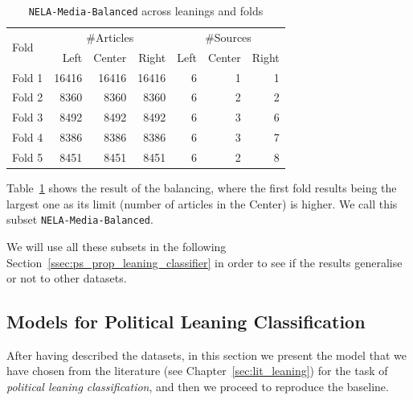 \begin{table}[!htbp]
    \centering
    \begin{tabular}{l|rrr|rrr}
        \multirow{2}{*}{Fold} & \multicolumn{3}{c}{\#Articles} & \multicolumn{3}{c}{\#Sources} \\
         & Left & Center & Right & Left & Center & Right \\
        \hline
        Fold 1 & 16416 & 16416 & 16416 & 6 & 1 & 1 \\
        Fold 2 & 8360 & 8360 & 8360 & 6 & 2 & 2 \\
        Fold 3 & 8492 & 8492 & 8492 & 6 & 3 & 6 \\
        Fold 4 & 8386 & 8386 & 8386 & 6 & 3 & 7 \\
        Fold 5 & 8451 & 8451 & 8451 & 6 & 2 & 8 \\
    \end{tabular}
    \caption{\texttt{NELA-Media-Balanced} across leanings and folds}
    \label{tab:nela_media_balanced}
\end{table}

Table~\ref{tab:nela_media_balanced} shows the result of the balancing, where the first fold results being the largest one as its limit (number of articles in the Center) is higher.
We call this subset \texttt{NELA-Media-Balanced}.

We will use all these subsets in the following Section~\ref{ssec:ps_prop_leaning_classifier} in order to see if the results generalise or not to other datasets.


\subsection{\statusgreen Models for Political Leaning Classification}
\label{ssec:ps_leaning_models}




After having described the datasets, in this section we present the model that we have chosen from the literature (see Chapter~\ref{sec:lit_leaning}) for the task of \emph{political leaning classification}, and then we proceed to reproduce the baseline.



